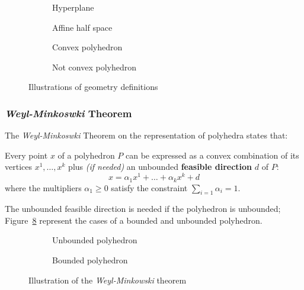 \documentclass[english]{article}
\begin{document}
\begin{figure}[htbp]
  \bigskip
  \centering
  \begin{subfigure}[b]{0.495\textwidth}
    \centering
    \bigskip
    \caption{Hyperplane}
    \label{subfig:hyperplane}
    \bigskip
  \end{subfigure}
  \bigskip
  \begin{subfigure}[b]{0.495\textwidth}
    \centering
    \bigskip
    \caption{Affine half space}
    \label{subfig:affine-half-space}
    \bigskip
  \end{subfigure}
  \begin{subfigure}[h]{0.495\textwidth}
    \centering
    \bigskip
    \caption{Convex polyhedron}
    \label{subfig:convex-hull}
    \bigskip
  \end{subfigure}
  \begin{subfigure}[h]{0.495\textwidth}
    \centering
    \bigskip
    \caption{Not convex polyhedron}
    \label{subfig:not-convex-hull}
    \bigskip
  \end{subfigure}
  \caption{Illustrations of \LP geometry definitions}
  \label{fig:lp-geometry}
  \bigskip
\end{figure}

\subsubsection{\textit{Weyl-Minkoswki} Theorem}

The \textit{Weyl-Minkoswki} Theorem on the representation of polyhedra states that:

\begin{theorem}
  Every point \(x\) of a polyhedron \(P\) can be expressed as a convex combination of its vertices \(x^1, \ldots, x^k\) plus \textit{(if needed)} an unbounded \textbf{feasible direction} \(d\) of \(P\):
  \[ x = \alpha_1 x^1 + \ldots + \alpha_k x^k + d \]
  where the multipliers \(\alpha_1 \geq 0\) satisfy the constraint \(\displaystyle\sum_{i=1} \alpha_i = 1\).
  \label{thm:weyl-minkowski}
\end{theorem}

\bigskip
The unbounded feasible direction is needed if the polyhedron is unbounded; Figure~\ref{fig:weyl-minkowski-theorem} represent the cases of a bounded and unbounded polyhedron.

\begin{figure}[htbp]
  \centering
  \bigskip
  \begin{subfigure}[h]{0.495\textwidth}
    \centering
    \bigskip
    \caption{Unbounded polyhedron}
    \label{subfig:unbounded-polyhedron}
    \bigskip
  \end{subfigure}
  \begin{subfigure}[h]{0.495\textwidth}
    \centering
    \bigskip
    \caption{Bounded polyhedron}
    \label{subfig:bounded-polyhedron}
    \bigskip
  \end{subfigure}
  \caption{Illustration of the \textit{Weyl-Minkowski} theorem}
  \label{fig:weyl-minkowski-theorem}
  \bigskip
\end{figure}
\end{document}
